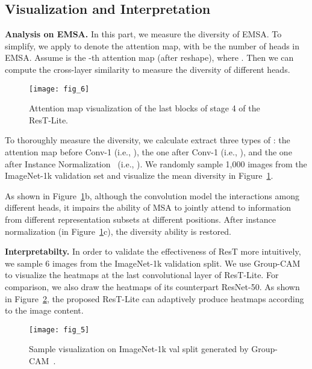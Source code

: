 \documentclass{article}
\begin{document}
\subsection{Visualization and Interpretation}
\label{sec:vis}

\textbf{Analysis on EMSA.}
In this part, we measure the diversity of EMSA. To simplify, we apply  to denote the attention map, with  be the number of heads in EMSA. Assume  is the -th attention map (after reshape), where . Then we can compute the cross-layer similarity to measure the diversity of different heads. 



\begin{figure}[htb]
	\centering
	\texttt{[image: fig\_6]}
	\caption{Attention map visualization of the last blocks of stage 4 of the ResT-Lite.}
	\label{fig:fig6}
\end{figure}

To thoroughly measure the diversity, we calculate extract three types of : the attention map before Conv-1 (i.e., ), the one after Conv-1 (i.e., ), and the one after Instance Normalization~\cite{DBLP:journals/corr/UlyanovVL16} (i.e., ). We randomly sample 1,000 images from the ImageNet-1k validation set and visualize the mean diversity in Figure~\ref{fig:fig6}. 

As shown in Figure~\ref{fig:fig6}b, although the  convolution model the interactions among different heads, it impairs the ability of MSA to jointly attend to information from different representation subsets at different positions. After instance normalization (in Figure~\ref{fig:fig6}c), the diversity ability is restored.

\textbf{Interpretabilty.}
In order to validate the effectiveness of ResT more intuitively, we sample 6 images from the ImageNet-1k validation split. We use Group-CAM~\cite{DBLP:journals/corr/abs-2103-13859} to visualize the heatmaps at the last convolutional layer of ResT-Lite. For comparison, we also draw the heatmaps of its counterpart ResNet-50. As shown in Figure~\ref{fig:fig5}, the proposed ResT-Lite can adaptively produce heatmaps according to the image content.

\begin{figure}[htb]
	\centering
	\texttt{[image: fig\_5]}
	\caption{Sample visualization on ImageNet-1k val split generated by Group-CAM~\cite{DBLP:journals/corr/abs-2103-13859}.}
	\label{fig:fig5}
\end{figure}
\end{document}
